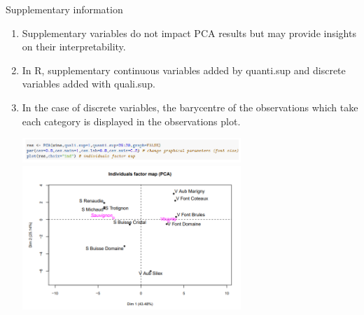 \documentclass[9pt]{beamer}
\begin{document}
%

\begin{frame}{Supplementary information}

\begin{enumerate}[-]
\item Supplementary variables \textcolor{lighto}{do not impact PCA results} but may provide insights on their interpretability.
\item In R, supplementary continuous variables added by \textcolor{lighto}{quanti.sup} and discrete variables added with \textcolor{lighto}{quali.sup}.
\item In the case of discrete variables,  the \textcolor{lighto}{barycentre of the observations which take each category} is displayed in the observations plot.

\begin{center}
\includegraphics[width=0.65\textwidth]{pca_supp_1}\\
\includegraphics[width=0.65\textwidth]{pca_supp_2}
\end{center}

\end{enumerate}

\end{frame}
\end{document}
